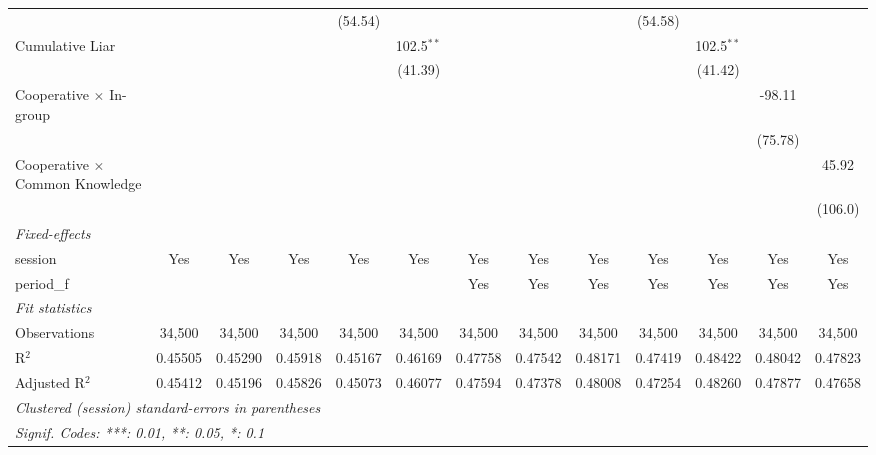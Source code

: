 \begin{tabular}{lcccccccccccc}
                                          &          &          &          & (54.54)  &              &          &          &          & (54.58)  &              &          &   \\   
   Cumulative Liar                        &          &          &          &          & 102.5$^{**}$ &          &          &          &          & 102.5$^{**}$ &          &   \\   
                                          &          &          &          &          & (41.39)      &          &          &          &          & (41.42)      &          &   \\   
   Cooperative $\times$ In-group          &          &          &          &          &              &          &          &          &          &              & -98.11   &   \\   
                                          &          &          &          &          &              &          &          &          &          &              & (75.78)  &   \\   
   Cooperative $\times$ Common Knowledge  &          &          &          &          &              &          &          &          &          &              &          & 45.92\\   
                                          &          &          &          &          &              &          &          &          &          &              &          & (106.0)\\   
   \midrule
   \emph{Fixed-effects}\\
   session                                & Yes      & Yes      & Yes      & Yes      & Yes          & Yes      & Yes      & Yes      & Yes      & Yes          & Yes      & Yes\\  
   period\_f                              &          &          &          &          &              & Yes      & Yes      & Yes      & Yes      & Yes          & Yes      & Yes\\  
   \midrule
   \emph{Fit statistics}\\
   Observations                           & 34,500   & 34,500   & 34,500   & 34,500   & 34,500       & 34,500   & 34,500   & 34,500   & 34,500   & 34,500       & 34,500   & 34,500\\  
   R$^2$                                  & 0.45505  & 0.45290  & 0.45918  & 0.45167  & 0.46169      & 0.47758  & 0.47542  & 0.48171  & 0.47419  & 0.48422      & 0.48042  & 0.47823\\  
   Adjusted R$^2$                         & 0.45412  & 0.45196  & 0.45826  & 0.45073  & 0.46077      & 0.47594  & 0.47378  & 0.48008  & 0.47254  & 0.48260      & 0.47877  & 0.47658\\  
   \midrule \midrule
   \multicolumn{13}{l}{\emph{Clustered (session) standard-errors in parentheses}}\\
   \multicolumn{13}{l}{\emph{Signif. Codes: ***: 0.01, **: 0.05, *: 0.1}}\\
\end{tabular}
\par\endgroup


